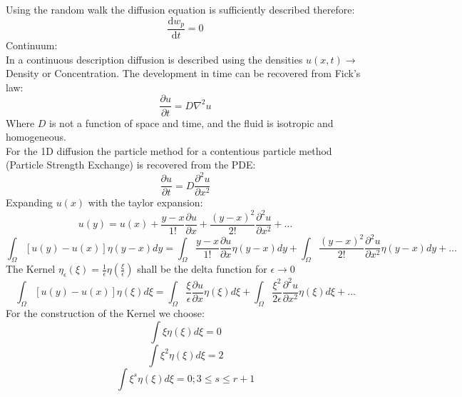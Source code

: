 \documentclass[hyperref]{labbook}
\numberwithin{equation}{experiment}
\numberwithin{table}{experiment}
\numberwithin{figure}{experiment}
\begin{document}
Using the random walk the diffusion equation is sufficiently described therefore:
\begin{equation}
\frac{\mathrm{d} w_p}{\mathrm{d}t} = 0
\end{equation}
Continuum:\\
In a continuous description diffusion is described using the densities $u(x,t) \rightarrow$ Density or Concentration. The development in time can be recovered from Fick's law:
\begin{equation}
\frac{\partial u}{\partial t} = D \nabla^2 u 
\end{equation}
Where $D$ is not a function of space and time, and the fluid is isotropic and homogeneous. \\
For the 1D diffusion the particle method for a contentious particle method (Particle Strength Exchange) is recovered from the PDE:
\begin{equation}
\frac{\partial u}{\partial t} = D \frac{\partial^2 u}{\partial x^2} 
\end{equation}
Expanding $u(x)$ with the taylor expansion: 
\begin{equation}
u(y) = u(x) + \frac{y-x}{1!}  \frac{\partial u}{\partial x} +  \frac{(y-x)^2}{2!} \frac{\partial^2 u}{\partial x^2}  + \dots
\end{equation}
\begin{equation}
\int_\Omega [u(y) - u(x)] \eta(y-x) dy = \int_\Omega \frac{y-x}{1!}  \frac{\partial u}{\partial x} \eta(y-x) dy  +   \int_\Omega\frac{(y-x)^2}{2!} \frac{\partial^2 u}{\partial x^2}  \eta(y-x) dy + \dots
\end{equation}
The Kernel  $\eta_\epsilon(\xi) = \frac{1}{\epsilon}\eta\left(\frac{\xi}{\epsilon}\right) $ shall be the delta function for $\epsilon \rightarrow 0 $
\begin{equation}
\int_\Omega [u(y) - u(x)] \eta(\xi) d\xi = \int_\Omega \frac{\xi}{\epsilon}  \frac{\partial u}{\partial x} \eta(\xi) d\xi  +   \int_\Omega\frac{\xi^2}{2\epsilon} \frac{\partial^2 u}{\partial x^2}  \eta(\xi) d\xi + \dots
\end{equation}
For the construction of the Kernel we choose: 
\begin{equation}
 \int \xi \eta(\xi) d\xi = 0 
\end{equation}
\begin{equation}
 \int \xi^2 \eta(\xi) d\xi = 2
\end{equation}
\begin{equation}
 \int \xi^s \eta(\xi) d\xi = 0; 3 \leq s \leq r +1 
\end{equation}
\end{document}
